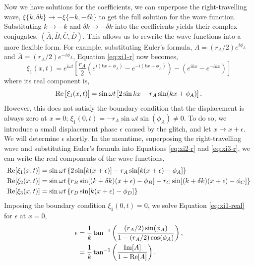Now we have solutions for the coefficients, we can superpose the right-travelling wave, \(\xi\{k, \delta k\} \rightarrow - \xi\{-k, -\delta k\}\) to get the full solution for the wave function. Substituting \(k \rightarrow -k\) and \(\delta k \rightarrow -\delta k\) into the coefficients yields their complex conjugates, \((\overline{A},\overline{B},\overline{C},\overline{D})\). This allows us to rewrite the wave functions into a more flexible form. For example, substituting Euler's formula, \(A = (r_A/2) e^{i\phi_A}\) and \(\overline{A} = (r_A/2) e^{-i\phi_A}\), Equation \ref{eq:xi1-r} now becomes,
%
\begin{equation}
    \xi_1(x, t) = e^{i \omega t} \left[ \frac{r_A}{2} \left( e^{i(kx + \phi_A)} - e^{-i(kx + \phi_A)} \right) - \left( e^{ikx} - e^{-ikx} \right) \right] \label{eq:xi1}
\end{equation}
%
where its real component is,
\begin{equation}
    {\mathrm{Re}}\left[\xi_1(x, t)\right] = \sin \omega t \left[2 \sin kx - r_A \sin(kx + \phi_A)\right].
\end{equation}
%
However, this does not satisfy the boundary condition that the displacement is always zero at \(x=0\); \(\xi_1(0, t) = - r_A \sin \omega t \sin(\phi_A) \neq 0\). To do so, we introduce a small displacement phase \(\epsilon\) caused by the glitch, and let \(x \rightarrow x + \epsilon\). We will determine \(\epsilon\) shortly. In the meantime, superposing the right-travelling wave and substituting Euler's formula into Equations \ref{eq:xi2-r} and \ref{eq:xi3-r}, we can write the real components of the wave functions,
%
%
%
\begin{align}
    {\mathrm{Re}}[\xi_1(x, t)] &= \sin \omega t \left\{2 \sin[k (x + \epsilon)] - r_A \sin[k(x + \epsilon) - \phi_A]\right\} \label{eq:xi1-real} \\
    {\mathrm{Re}}[\xi_2(x, t)] &= \sin \omega t \left\{ r_B \sin[(k + \delta k)(x + \epsilon) - \phi_B] - r_C \sin[(k + \delta k)(x + \epsilon) - \phi_C]\right\} \\
    {\mathrm{Re}}[\xi_3(x, t)] &= \sin \omega t \left\{r_D \sin[k(x + \epsilon) - \phi_D]\right\} \label{eq:xi3-real}
\end{align}
%
Imposing the boundary condition \(\xi_1(0, t) = 0\), we solve Equation \ref{eq:xi1-real} for \(\epsilon\) at \(x=0\),
%
\begin{align}
    \epsilon &= \frac{1}{k} \tan^{-1}\left( \frac{(r_A / 2) \sin(\phi_A)}{1 - (r_A/2) \cos(\phi_A)} \right), \notag\\
    &= \frac{1}{k} \tan^{-1}\left( \frac{{\mathrm{Im}}[A]}{1 - {\mathrm{Re}}[A]} \right). \label{eq:1d-phase}
\end{align}
%

